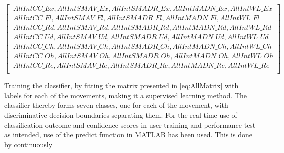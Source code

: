\small \begin{equation} \label{eq:AllMatrix}
\begin{bmatrix} 
\ AllIntCC\_Ex, AllIntSMAV\_Ex, AllIntSMADR\_Ex, AllIntMADN\_Ex, AllIntWL\_Ex \\
\ AllIntCC\_Fl, AllIntSMAV\_Fl, AllIntSMADR\_Fl, AllIntMADN\_Fl, AllIntWL\_Fl \\
\ AllIntCC\_Rd, AllIntSMAV\_Rd, AllIntSMADR\_Rd, AllIntMADN\_Rd, AllIntWL\_Rd \\
\ AllIntCC\_Ud, AllIntSMAV\_Ud, AllIntSMADR\_Ud, AllIntMADN\_Ud, AllIntWL\_Ud \\
\ AllIntCC\_Ch, AllIntSMAV\_Ch, AllIntSMADR\_Ch, AllIntMADN\_Ch, AllIntWL\_Ch \\
\ AllIntCC\_Oh, AllIntSMAV\_Oh, AllIntSMADR\_Oh, AllIntMADN\_Oh, AllIntWL\_Oh \\
\ AllIntCC\_Re, AllIntSMAV\_Re, AllIntSMADR\_Re, AllIntMADN\_Re, AllIntWL\_Re \\
\end{bmatrix}
\end{equation}

Training the classifier, by fitting the matrix presented in \eqref{eq:AllMatrix} with labels for each of the movements, making it a supervised learning method. The classifier thereby forms seven classes, one for each of the movement, with discriminative decision boundaries separating them. For the real-time use of classification outcome and confidence scores in user training and performance test as intended, use of the predict function in MATLAB has been used. This is done by continuously     


